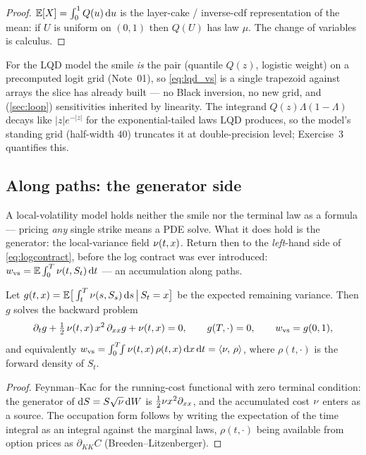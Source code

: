 \documentclass[11pt]{article}
\newcommand{\wvs}{w_{\mathrm{vs}}}
\newcommand{\Lo}{\Lambda}
\begin{document}
\begin{proof}
$\mathbb{E}[X]=\int_0^1 Q(u)\,\mathrm{d} u$ is the layer-cake / inverse-cdf
representation of the mean: if $U$ is uniform on $(0,1)$ then $Q(U)$ has
law $\mu$.  The change of variables is calculus.
\end{proof}

For the LQD model the smile \emph{is} the pair (quantile $Q(z)$, logistic
weight) on a precomputed logit grid (Note~01), so \eqref{eq:lqd_vs} is a
single trapezoid against arrays the slice has already built --- no Black
inversion, no new grid, and (\cref{sec:loop}) sensitivities inherited by
linearity.  The integrand $Q(z)\Lo(1-\Lo)$ decays like $|z|e^{-|z|}$
for the exponential-tailed laws LQD produces, so the model's standing
grid (half-width $40$) truncates it at double-precision level; Exercise~3
quantifies this.

\subsection{Along paths: the generator side}

A local-volatility model holds neither the smile nor the terminal law as
a formula --- pricing \emph{any} single strike means a PDE solve.  What
it does hold is the generator: the local-variance field
$\nu(t,x)$.  Return then to the \emph{left}-hand side of
\eqref{eq:logcontract}, before the log contract was ever introduced:
$\wvs=\E\int_0^T\locvar(t,S_t)\,\dd t$ --- an accumulation along paths.

\begin{proposition}
\label{prop:source}
Let $g(t,x)=\mathbb{E}\big[\int_t^T\nu(s,S_s)\,\mathrm{d} s\,\big|\,S_t=x\big]$ be
the expected remaining variance.  Then $g$ solves the backward problem
\begin{equation}
\partial_t g+\tfrac12\,\locvar(t,x)\,x^{2}\,\partial_{xx}g
+\locvar(t,x)=0,
\qquad g(T,\cdot)=0,
\qquad \wvs=g(0,1),
\label{eq:source_pde}
\end{equation}
and equivalently $\wvs=\int_0^T\!\!\int\locvar(t,x)\,\rho(t,x)\,\dd x\,
\dd t=\inner{\locvar,\,\rho}$, where $\rho(t,\cdot)$ is the forward
density of $S_t$.
\end{proposition}

\begin{proof}
Feynman--Kac for the running-cost functional with zero terminal
condition: the generator of $\mathrm{d} S=S\sqrt{\nu}\,\mathrm{d} W$ is
$\tfrac12\nu x^2\partial_{xx}$, and the accumulated cost $\nu$
enters as a source.  The occupation form follows by writing the
expectation of the time integral as an integral against the marginal
laws, $\rho(t,\cdot)$ being available from option prices as
$\partial_{KK}C$ (Breeden--Litzenberger).
\end{proof}
\end{document}
